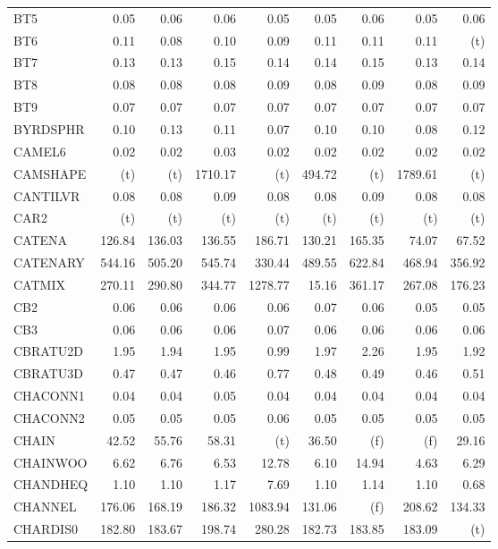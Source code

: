 \documentclass[11pt,twoside]{article}
\begin{document}
{\begin{longtable}[c]{|l|r|r|r|r|r|r|r|r|}
BT5 & 0.05 & 0.06 & 0.06 & 0.05 & 0.05 & 0.06 & 0.05 & 0.06 \\
BT6 & 0.11 & 0.08 & 0.10 & 0.09 & 0.11 & 0.11 & 0.11 & (t) \\
BT7 & 0.13 & 0.13 & 0.15 & 0.14 & 0.14 & 0.15 & 0.13 & 0.14 \\
BT8 & 0.08 & 0.08 & 0.08 & 0.09 & 0.08 & 0.09 & 0.08 & 0.09 \\
BT9 & 0.07 & 0.07 & 0.07 & 0.07 & 0.07 & 0.07 & 0.07 & 0.07 \\
BYRDSPHR & 0.10 & 0.13 & 0.11 & 0.07 & 0.10 & 0.10 & 0.08 & 0.12 \\
CAMEL6 & 0.02 & 0.02 & 0.03 & 0.02 & 0.02 & 0.02 & 0.02 & 0.02 \\
CAMSHAPE & (t) & (t) & 1710.17 & (t) & 494.72 & (t) & 1789.61 & (t) \\
CANTILVR & 0.08 & 0.08 & 0.09 & 0.08 & 0.08 & 0.09 & 0.08 & 0.08 \\
CAR2 & (t) & (t) & (t) & (t) & (t) & (t) & (t) & (t) \\
CATENA & 126.84 & 136.03 & 136.55 & 186.71 & 130.21 & 165.35 & 74.07 & 67.52 \\
CATENARY & 544.16 & 505.20 & 545.74 & 330.44 & 489.55 & 622.84 & 468.94 & 356.92 \\
CATMIX & 270.11 & 290.80 & 344.77 & 1278.77 & 15.16 & 361.17 & 267.08 & 176.23 \\
CB2 & 0.06 & 0.06 & 0.06 & 0.06 & 0.07 & 0.06 & 0.05 & 0.05 \\
CB3 & 0.06 & 0.06 & 0.06 & 0.07 & 0.06 & 0.06 & 0.06 & 0.06 \\
CBRATU2D & 1.95 & 1.94 & 1.95 & 0.99 & 1.97 & 2.26 & 1.95 & 1.92 \\
CBRATU3D & 0.47 & 0.47 & 0.46 & 0.77 & 0.48 & 0.49 & 0.46 & 0.51 \\
CHACONN1 & 0.04 & 0.04 & 0.05 & 0.04 & 0.04 & 0.04 & 0.04 & 0.04 \\
CHACONN2 & 0.05 & 0.05 & 0.05 & 0.06 & 0.05 & 0.05 & 0.05 & 0.05 \\
CHAIN & 42.52 & 55.76 & 58.31 & (t) & 36.50 & (f) & (f) & 29.16 \\
CHAINWOO & 6.62 & 6.76 & 6.53 & 12.78 & 6.10 & 14.94 & 4.63 & 6.29 \\
CHANDHEQ & 1.10 & 1.10 & 1.17 & 7.69 & 1.10 & 1.14 & 1.10 & 0.68 \\
CHANNEL & 176.06 & 168.19 & 186.32 & 1083.94 & 131.06 & (f) & 208.62 & 134.33 \\
CHARDIS0 & 182.80 & 183.67 & 198.74 & 280.28 & 182.73 & 183.85 & 183.09 & (t) \\

\end{longtable}}
\end{document}
